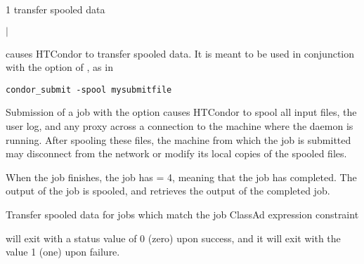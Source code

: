 \begin{ManPage}{\label{man-condor-transfer-data}}{1}
{transfer spooled data}
\Synopsis {}
\ToolArgsBase

\ToolLocate
\ToolJobs
$|$  \Dots

\ToolLocate
\ToolAll


\Description
{} causes HTCondor to transfer spooled
data.
It is meant to be used in conjunction with the 
option of , as in
\footnotesize
\begin{verbatim}
condor_submit -spool mysubmitfile
\end{verbatim}
\normalsize
Submission of a job with the  option causes HTCondor
to spool all input files, the user log, and any proxy across
a connection to the machine where the  daemon
is running.
After spooling these files,
the machine from which the job is submitted may
disconnect from the network
or modify its local copies of the spooled files.

When the job finishes,
the job has  = 4, meaning that the job has
completed.
The output of the job is spooled,
and
 retrieves the output of the completed
job.



\begin{Options}
  \ToolArgsBaseDesc
  \ToolLocateDesc
   {Transfer spooled data for
  jobs which match the job ClassAd expression constraint}
\end{Options}

\ExitStatus

 will exit with a status value of 0 (zero) upon success,
and it will exit with the value 1 (one) upon failure.

\end{ManPage}
